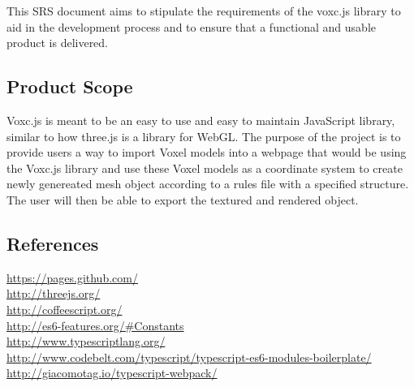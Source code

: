 \documentclass[english]{article}
\begin{document}
		This SRS document aims to stipulate the requirements of the voxc.js library to aid in the development process and to ensure that a functional and usable product is delivered.
		
		\subsection{Product Scope}
		
		Voxc.js is meant to be an easy to use and easy to maintain JavaScript library, similar to how three.js is a library for WebGL. The purpose of the project is to provide users a way to import Voxel models into a webpage that would be using the Voxc.js library and use these Voxel models as a coordinate system to create newly genereated mesh object according to a rules file with a specified structure. The user will then be able to export the textured and rendered object.
		
		\subsection{References}
		
		\color{blue}
		\url{https://pages.github.com/}
		\newline
		\\\url{http://threejs.org/}
		\newline
		\\\url{http://coffeescript.org/}
		\newline
		\\\url{http://es6-features.org/#Constants}
		\newline
		\\\url{http://www.typescriptlang.org/}
		\newline
		\\\url{http://www.codebelt.com/typescript/typescript-es6-modules-boilerplate/}
		\newline
		\\\url{http://giacomotag.io/typescript-webpack/}
		\color{black}
		
	\pagebreak
	
\end{document}
